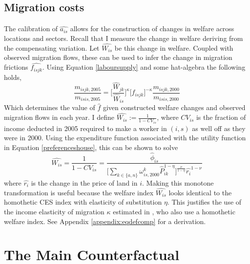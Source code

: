 \documentclass[]{article}
\theoremstyle{plain}
\begin{document}
\subsection*{Migration costs}
\paragraph*{}
The calibration of $\hat{a_{is}}$ allows for the construction of changes in welfare across locations and sectors. Recall that I measure the change in welfare deriving from the compensating variation. Let $\hat{W_{is}}$ be this change in welfare. Coupled with observed migration flows, these can be used to infer the change in migration frictions $\hat{f_{isjk}}$. Using Equation \eqref{laboursupply} and some hat-algebra the following holds,
\begin{equation}
		\frac{m_{isjk, 2005}}{m_{isis, 2005}} = \bigg[\frac{\hat{W}_{jk}}{\hat{W}_{is}}\bigg]^{\kappa} \big[\hat{f_{isjk}}\big]^{-\kappa} \frac{m_{isjk, 2000}}{m_{isis, 2000}}
\end{equation}
Which determines the value of $\hat{f}$ given constructed welfare changes and observed migration flows in each year. I define $\hat{W_{is}} := \frac{1}{1-CV_{is}}$, where $CV_{is}$ is the fraction of income deducted in 2005 required to make a worker in $(i, s)$ as well off as they were in 2000. Using the expenditure function associated with the utility function in Equation \eqref{preferenceshouse}, this can be shown to solve  
\begin{equation}
	\hat{W_{is}} = \frac{1}{1 - CV_{is}} = \frac{\hat{\phi}_{is}}{\bigg[\sum_{k \in \{a, n\}}\omega_{is, 2000}^{k}\hat{P}_{ik}^{1-\eta}\bigg]^{\frac{\nu}{1-\eta}}\hat{r_{i}}^{1-\nu}}
\end{equation}
where $\hat{r_{i}}$ is the change in the price of land in $i$. Making this monotone transformation is useful because the welfare index $\hat{W_{is}}$ looks identical to the homothetic CES index with elasticity of substitution $\eta$. This justifies the use of the income elasticity of migration $\kappa$ estimated in \cite{tombezhu}, who also use a homothetic welfare index. See Appendix \ref{appendix:eqdefcomp} for a derivation.

\section{The Main Counterfactual}\label{section:results}
\end{document}
